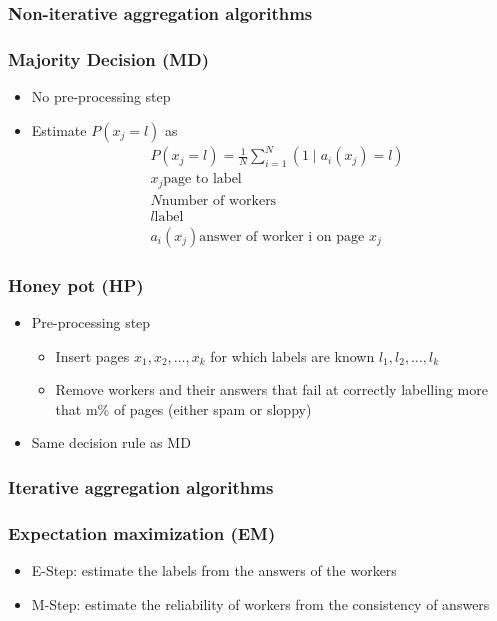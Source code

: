 \subsubsection{Non-iterative aggregation algorithms}

\subsubsection{Majority Decision (MD)}
\begin{itemize}
\item No pre-processing step
\item Estimate $ P(x_j = l ) $ as
  \begin{align*}
    & P(x_j = l) = \frac{1}{N} \sum_{i = 1}^N (1 \mid a_i (x_j) = l)
    \\
    & x_j \text{page to label} \\
    & N \text{number of workers} \\
    & l \text{label} \\
    & a_i(x_j) \text{answer of worker i on page } x_j
  \end{align*}
\end{itemize}

\subsubsection{Honey pot (HP)}
\begin{itemize}
\item Pre-processing step
  \begin{itemize}
  \item Insert pages $ x_1, x_2, \ldots, x_k$ for which labels are
    known $ l_1, l_2, \ldots, l_k $
  \item Remove workers and their answers that fail at correctly
    labelling more that m\% of pages (either spam or sloppy)
  \end{itemize}
\item Same decision rule as MD
\end{itemize}

\subsubsection{Iterative aggregation algorithms}
\subsubsection{Expectation maximization (EM)}
\begin{itemize}
\item E-Step: estimate the labels from the answers of the workers
\item M-Step: estimate the reliability of workers from the consistency
  of answers
\end{itemize}

